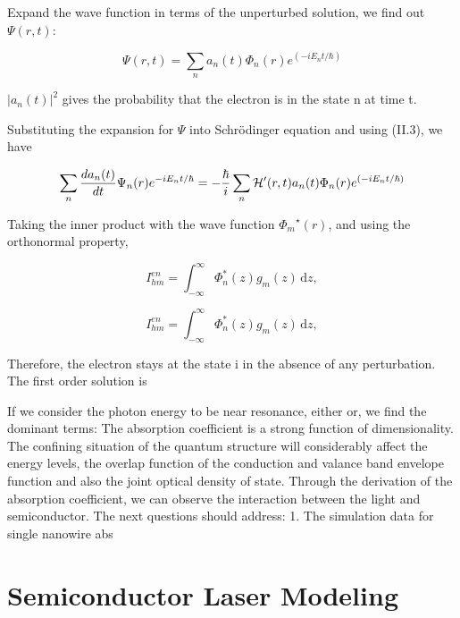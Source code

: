 Expand the wave function in terms of the unperturbed solution, we find out $\Psi(r,t)$:

\begin{equation}
  \Psi(r,t) = \sum_{n}a_n(t)\Phi_n(r)e^{(-iE_{n}t/\hbar)}
\end{equation}

$|a_n(t)|^2$ gives the probability that the electron is in the state n at time t.

Substituting the expansion for $\Psi$ into Schrödinger equation and using (II.3), we
have

\begin{equation}
  \sum_n \frac{da_n(t)}{dt}\Psi_n(r)e^{-iE_{n}t/\hbar} = -\frac{\hbar}{i}\sum_n \mathcal{H}^{\prime}(r,t)a_n(t)\Phi_n(r)e^{(-iE_{n}t/\hbar)}
\end{equation}

Taking the inner product with the wave function ${\Phi_m}^\star(r)$, and using the orthonormal
property,

\begin{equation}
  {I_{hm}^{en}}=\int_{-\infty}^\infty{\Phi_n^\ast}(z){g_m(z)}\,\mathrm{d}z,
\end{equation}

\begin{equation}
{I_{hm}^{en}}=\int_{-\infty}^\infty{\Phi_n^\ast}(z){g_m(z)}\,\mathrm{d}z,
\label{eq:seven}
\end{equation}

Therefore, the electron stays at the state i in the absence of any
perturbation. The first order solution is 

If we consider the photon energy to be near resonance, either  or, we find the
dominant terms: The absorption coefficient is a strong function of
dimensionality. The confining situation of the quantum structure will
considerably affect the energy levels, the overlap function of the conduction
and valance band envelope function and also the joint optical density of state.
Through the derivation of the absorption coefficient, we can observe the
interaction between the light and semiconductor.  The next questions should
address: 1. The simulation data for single nanowire abs

\chapter{Semiconductor Laser Modeling}
\label{sec:model}

